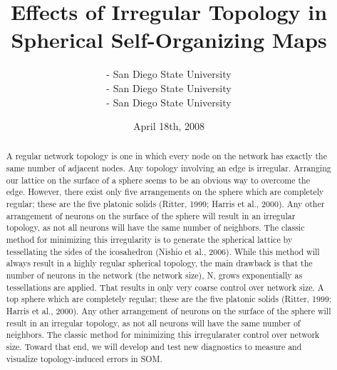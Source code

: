 \documentclass[11pt]{article}
\begin{document}
\title{Effects of Irregular Topology in Spherical Self-Organizing Maps}
\author{ - San Diego State University\\
	 - San Diego State University\\
	 - San Diego State University}

\date{April 18th, 2008}
\maketitle
\begin{abstract}
A regular network topology is one in which every node on the network has
exactly the same number of adjacent nodes. Any topology involving an edge is
irregular. Arranging our lattice on the surface of a sphere seems to be an
obvious way to overcome the edge. However, there exist only five arrangements
on the sphere which are completely regular; these are the five platonic solids
(Ritter, 1999; Harris et al., 2000).  Any other arrangement of neurons on the
surface of the sphere will result in an irregular topology, as not all neurons
will have the same number of neighbors. The classic method for minimizing this
irregularity is to generate the spherical lattice by tessellating the sides of
the icosahedron (Nishio et al., 2006). While this method will always result in
a highly regular spherical topology, the main drawback is that the number of
neurons in the network (the network size), N, grows exponentially as
tessellations are applied. That results in only very coarse control over
network size.  A top sphere which are completely regular; these are the five
platonic solids (Ritter, 1999; Harris et al., 2000).  Any other arrangement of
neurons on the surface of the sphere will result in an irregular topology, as
not all neurons will have the same number of neighbors. The classic method for
minimizing this irregularater control over network size. Toward that end, we
will develop and test new diagnostics to measure and visualize
topology-induced errors in SOM.
\end{abstract}
\end{document}
